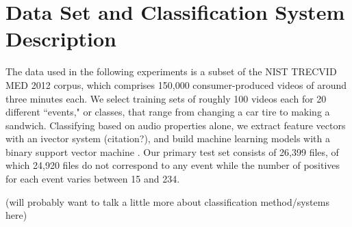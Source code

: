 \section{Data Set and Classification System Description}

The data used in the following experiments is a subset of the NIST TRECVID MED 2012 corpus, which comprises 150,000 consumer-produced videos of around three minutes each. 
We select training sets of roughly 100 videos each for 20 different ``events," or classes, that range from changing a car tire to making a sandwich. 
Classifying based on audio properties alone, we extract feature vectors with an ivector system (citation?), and build machine learning models with a binary support vector machine \cite{svm}. 
Our primary test set consists of 26,399 files, of which 24,920 files do not correspond to any event while the number of positives for each event varies between 15 and 234.

(will probably want to talk a little more about classification method/systems here) 

